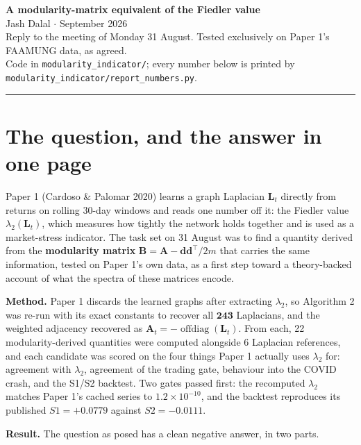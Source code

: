 \documentclass[11pt,a4paper]{article}
\newcommand{\Lap}{\mathbf{L}}
\newcommand{\Amat}{\mathbf{A}}
\newcommand{\Bmat}{\mathbf{B}}
\newcommand{\dvec}{\mathbf{d}}
\begin{document}
\begin{center}
{\Large\textbf{A modularity-matrix equivalent of the Fiedler value}}\\[2mm]
{\normalsize Jash Dalal \quad$\cdot$ September 2026}\\[1mm]
{\small Reply to the meeting of Monday 31 August. Tested exclusively on Paper 1's
FAAMUNG data, as agreed.\\ Code in \texttt{modularity\_indicator/}; every number
below is printed by \texttt{modularity\_indicator/report\_numbers.py}.}
\end{center}
\vspace{2mm}
\hrule
\vspace{4mm}

\section{The question, and the answer in one page}

Paper 1 (Cardoso \& Palomar 2020) learns a graph Laplacian $\Lap_t$ directly from
returns on rolling 30-day windows and reads one number off it: the Fiedler value
$\lambda_2(\Lap_t)$, which measures how tightly the network holds together and is
used as a market-stress indicator. The task set on 31 August was to find a
quantity derived from the \textbf{modularity matrix}
$\Bmat = \Amat - \dvec\dvec^{\!\top}\!/2m$ that carries the same information, tested
on Paper 1's own data, as a first step toward a theory-backed account of what the
spectra of these matrices encode.

\textbf{Method.} Paper 1 discards the learned graphs after extracting $\lambda_2$,
so Algorithm 2 was re-run with its exact constants to recover all
$\mathbf{243}$ Laplacians, and the weighted adjacency recovered as
$\Amat_t = -\operatorname{offdiag}(\Lap_t)$. From each, 22 modularity-derived
quantities were computed alongside 6 Laplacian references, and each candidate was
scored on the four things Paper 1 actually uses $\lambda_2$ for: agreement with
$\lambda_2$, agreement of the trading gate, behaviour into the COVID crash, and
the S1/S2 backtest. Two gates passed first: the recomputed $\lambda_2$ matches
Paper 1's cached series to $1.2\times10^{-10}$, and the backtest reproduces its
published $S1 = +0.0779$ against $S2 = -0.0111$.

\textbf{Result.} The question as posed has a clean negative answer, in two parts.
\end{document}
